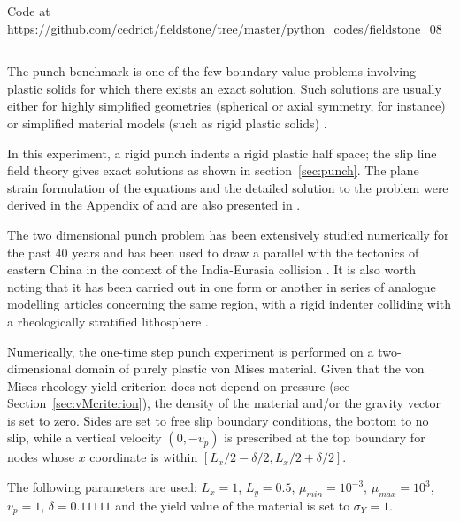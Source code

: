 

\begin{center}
Code at \url{https://github.com/cedrict/fieldstone/tree/master/python_codes/fieldstone_08}
\end{center}

\par\noindent\rule{\textwidth}{0.4pt}

The punch benchmark is one of the few boundary value problems involving plastic solids for which there exists an exact solution. 
Such solutions are usually either for highly simplified geometries (spherical or axial symmetry, for instance) or simplified material models (such as rigid plastic solids) \cite{kacha04}.

In this experiment, a rigid punch indents a rigid plastic half space; the slip line field theory gives 
exact solutions as shown in section~\ref{sec:punch}. 
The plane strain formulation of the equations and the detailed solution to the problem were derived in the Appendix of \cite{thfb08} and are also presented in \cite{gepd98}.

The two dimensional punch problem has been extensively studied numerically for the past 40 years 
\cite{zihl75,zihp95,chpe01,chan99,huhy99,yuti06,bufs08,raab07} and has been used to draw a parallel 
with the tectonics of eastern China in the context of the 
India-Eurasia collision \cite{tamo76,mota77}.
It is also worth noting that it has been carried out in one form or another in series of 
analogue modelling articles 
concerning the same region, with a rigid indenter colliding with a rheologically stratified 
lithosphere \cite{peta88,daco88,jodc90}.
 
Numerically, the one-time step punch experiment is performed on a two-dimensional
domain of purely plastic von Mises material. 
Given that the von Mises rheology yield criterion does not depend on pressure
(see Section~\ref{sec:vMcriterion}), the density of the material and/or the gravity 
vector is set to zero. Sides are set to free slip boundary conditions, the bottom to no slip, 
while a vertical velocity $(0,-v_p)$ is prescribed at the top boundary for nodes 
whose $x$ coordinate is within $[L_x/2-\delta/2,L_x/2+\delta/2]$. 

The following parameters are used: $L_x=1$, $L_y=0.5$, $\mu_{min}=10^{-3}$, 
$\mu_{max}=10^3$, $v_p=1$, $\delta=0.11111$ 
and the yield value of the material is set to $\sigma_Y=1$. 

